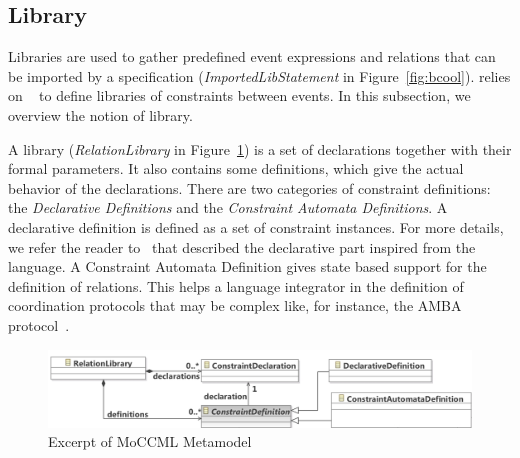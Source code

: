 \subsection{Library}
\label{subsec:bcoollib}

Libraries are used to gather predefined event expressions and relations that can be imported by a \bcool specification (\emph{ImportedLibStatement} in Figure~\ref{fig:bcool}). \bcool relies on \moccml~\cite{moccmlbib} to define libraries of constraints between events. In this subsection, we overview the notion of \moccml library.

A \moccml library (\emph{RelationLibrary} in Figure~\ref{fig:moccml}) is a set of declarations together with their formal parameters. It also contains some definitions, which give the actual behavior of the declarations. There are two categories of constraint definitions: the \emph{Declarative Definitions} and the \emph{Constraint Automata Definitions}. A declarative definition is defined as a set of constraint instances. For more details, we refer the reader to~\cite{moccmloperbib} that described the declarative part inspired from the \ccsl language. A Constraint Automata Definition gives state based support for the definition of relations. This helps a language integrator in the definition of coordination protocols that may be complex like, for instance, the AMBA protocol~\cite{ambabus}. 

\begin{figure}[h]
	\center
	\includegraphics[width=.8\textwidth]{bcool/figs/moccmlmm}
	\caption{Excerpt of MoCCML Metamodel}
	\label{fig:moccml}
\end{figure}


